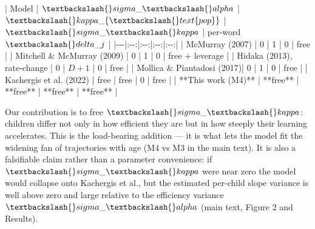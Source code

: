 \documentclass[
  11pt,
]{article}
\newenvironment{Shaded}{\begin{snugshade}}{\end{snugshade}}
\newcommand{\NormalTok}[1]{\textcolor[rgb]{0.00,0.23,0.31}{#1}}
\newcommand{\PreprocessorTok}[1]{\textcolor[rgb]{0.68,0.00,0.00}{#1}}
\begin{document}
\begin{Shaded}
\begin{Highlighting}[]
\PreprocessorTok{|}\NormalTok{ Model }\PreprocessorTok{|}\NormalTok{ $\textbackslash{}sigma\_\textbackslash{}alpha$ }\PreprocessorTok{|}\NormalTok{ $\textbackslash{}kappa\_\{\textbackslash{}text\{pop\}\}$ }\PreprocessorTok{|}\NormalTok{ $\textbackslash{}sigma\_\textbackslash{}kappa$ }\PreprocessorTok{|}\NormalTok{ per{-}word $\textbackslash{}delta\_j$ }\PreprocessorTok{|}
\PreprocessorTok{|{-}{-}{-}|}\NormalTok{:{-}{-}:}\PreprocessorTok{|}\NormalTok{:{-}{-}:}\PreprocessorTok{|}\NormalTok{:{-}{-}:}\PreprocessorTok{|}\NormalTok{:{-}{-}:}\PreprocessorTok{|}
\PreprocessorTok{|}\NormalTok{ McMurray (2007)            }\PreprocessorTok{|}\NormalTok{ 0 }\PreprocessorTok{|}\NormalTok{ 1     }\PreprocessorTok{|}\NormalTok{ 0 }\PreprocessorTok{|}\NormalTok{ free }\PreprocessorTok{|}
\PreprocessorTok{|}\NormalTok{ Mitchell \& McMurray (2009) }\PreprocessorTok{|}\NormalTok{ 0 }\PreprocessorTok{|}\NormalTok{ 1     }\PreprocessorTok{|}\NormalTok{ 0 }\PreprocessorTok{|}\NormalTok{ free + leverage }\PreprocessorTok{|}
\PreprocessorTok{|}\NormalTok{ Hidaka (2013), rate{-}change }\PreprocessorTok{|}\NormalTok{ 0 }\PreprocessorTok{|}\NormalTok{ $D+1$ }\PreprocessorTok{|}\NormalTok{ 0 }\PreprocessorTok{|}\NormalTok{ free }\PreprocessorTok{|}
\PreprocessorTok{|}\NormalTok{ Mollica \& Piantadosi (2017)}\PreprocessorTok{|}\NormalTok{ 0 }\PreprocessorTok{|}\NormalTok{ 1     }\PreprocessorTok{|}\NormalTok{ 0 }\PreprocessorTok{|}\NormalTok{ free }\PreprocessorTok{|}
\PreprocessorTok{|}\NormalTok{ Kachergis et al. (2022)    }\PreprocessorTok{|}\NormalTok{ free }\PreprocessorTok{|}\NormalTok{ free }\PreprocessorTok{|}\NormalTok{ 0 }\PreprocessorTok{|}\NormalTok{ free }\PreprocessorTok{|}
\PreprocessorTok{|}\NormalTok{ **This work (M4)**         | **free** | **free** | **free** | **free** }\PreprocessorTok{|}

\NormalTok{Our contribution is to free $\textbackslash{}sigma\_\textbackslash{}kappa$: children differ not only in}
\NormalTok{how efficient they are but in how steeply their learning accelerates. This}
\NormalTok{is the load{-}bearing addition — it is what lets the model fit the widening}
\NormalTok{fan of trajectories with age (M4 vs M3 in the main text). It is also a}
\NormalTok{falsifiable claim rather than a parameter convenience: if $\textbackslash{}sigma\_\textbackslash{}kappa$}
\NormalTok{were near zero the model would collapse onto Kachergis et al., but the}
\NormalTok{estimated per{-}child slope variance is well above zero and large relative}
\NormalTok{to the efficiency variance $\textbackslash{}sigma\_\textbackslash{}alpha$ (main text, Figure 2 and}
\NormalTok{Results).}
\end{Highlighting}
\end{Shaded}
\end{document}
